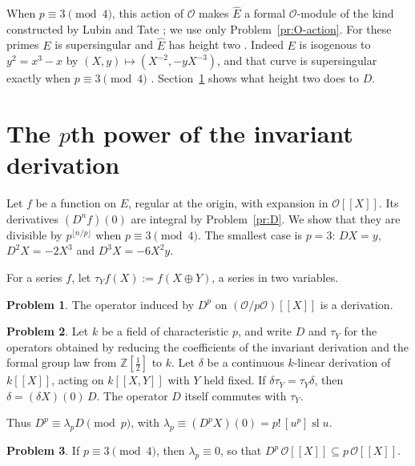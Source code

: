 \documentclass[reqno]{amsart}
\theoremstyle{definition}
\newtheorem{problem}{Problem}[section]
\theoremstyle{plain}
\newcommand{\Z}{\mathbb{Z}}
\newcommand{\Oc}{\mathcal{O}}
\newcommand{\sll}{\operatorname{sl}}
\begin{document}
When \(p \equiv 3 \pmod 4\), this action of \(\Oc\) makes \(\hat E\) a formal \(\Oc\)-module of the kind constructed by Lubin and Tate \cite{LT}; we use only Problem~\ref{pr:O-action}.  For these primes \(E\) is supersingular and \(\hat E\) has height two \cite[Thm.~V.3.1]{Si1}.  Indeed \(E\) is isogenous to \(y^2 = x^3 - x\) by \((X, y) \mapsto (X^{-2}, -yX^{-3})\), and that curve is supersingular exactly when \(p \equiv 3 \pmod 4\) \cite[\S V.4]{Si1}.  Section~\ref{sec:Dp} shows what height two does to \(D\).

\section{The \texorpdfstring{\(p\)}{p}th power of the invariant derivation}\label{sec:Dp}

Let \(f\) be a function on \(E\), regular at the origin, with expansion in \(\Oc[[X]]\).  Its derivatives \((D^n f)(0)\) are integral by Problem~\ref{pr:D}.  We show that they are divisible by \(p^{\lfloor n/p \rfloor}\) when \(p \equiv 3 \pmod 4\).  The smallest case is \(p = 3\): \(DX = y\), \(D^2X = -2X^3\) and \(D^3X = -6X^2y\).

For a series \(f\), let \(\tau_Y f(X) := f(X \oplus Y)\), a series in two variables.

\begin{problem}\label{pr:Dp-derivation}
The operator induced by \(D^p\) on \((\Oc/p\Oc)[[X]]\) is a derivation.
\end{problem}

\begin{problem}\label{pr:invariant}
Let \(k\) be a field of characteristic \(p\), and write \(D\) and \(\tau_Y\) for the operators obtained by reducing the coefficients of the invariant derivation and the formal group law from \(\Z[\tfrac12]\) to \(k\).  Let \(\delta\) be a continuous \(k\)-linear derivation of \(k[[X]]\), acting on \(k[[X,Y]]\) with \(Y\) held fixed.  If \(\delta \tau_Y = \tau_Y \delta\), then \(\delta = (\delta X)(0)\, D\).  The operator \(D\) itself commutes with \(\tau_Y\).
\end{problem}

Thus \(D^p \equiv \lambda_p D \pmod p\), with \(\lambda_p \equiv (D^p X)(0) = p!\, [u^p] \sll u\).

\begin{problem}\label{pr:Dp}
If \(p \equiv 3 \pmod 4\), then \(\lambda_p \equiv 0\), so that \(D^p\, \Oc[[X]] \subseteq p\, \Oc[[X]]\).
\end{problem}
\end{document}
